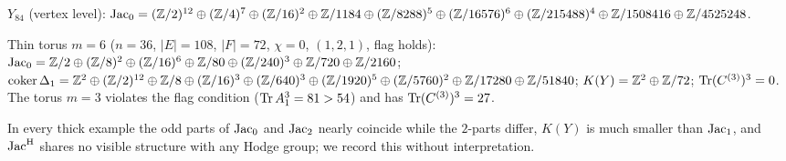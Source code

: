 $Y_{84}$ (vertex level): $\operatorname{Jac}_0=(\mathbb{Z}/2)^{12}\oplus(\mathbb{Z}/4)^{7}\oplus(\mathbb{Z}/16)^{2}\oplus\mathbb{Z}/1184\oplus
(\mathbb{Z}/8288)^{5}\oplus(\mathbb{Z}/16576)^{6}\oplus(\mathbb{Z}/215488)^{4}\oplus\mathbb{Z}/1508416\oplus\mathbb{Z}/4525248$.

Thin torus $m=6$ ($n=36$, $|E|=108$, $|F|=72$, $\chi=0$, $(1,2,1)$, flag holds):
$\operatorname{Jac}_0=\mathbb{Z}/2\oplus(\mathbb{Z}/8)^{2}\oplus(\mathbb{Z}/16)^{6}\oplus\mathbb{Z}/80\oplus(\mathbb{Z}/240)^{3}\oplus\mathbb{Z}/720\oplus\mathbb{Z}/2160$;
$\operatorname{coker}\Delta_1=\mathbb{Z}^{2}\oplus(\mathbb{Z}/2)^{12}\oplus\mathbb{Z}/8\oplus(\mathbb{Z}/16)^{3}\oplus(\mathbb{Z}/640)^{3}\oplus(\mathbb{Z}/1920)^{5}
\oplus(\mathbb{Z}/5760)^{2}\oplus\mathbb{Z}/17280\oplus\mathbb{Z}/51840$; $K(Y)=\mathbb{Z}^{2}\oplus\mathbb{Z}/72$;
$\operatorname{Tr}(C^{(3)})^{3}=0$. The torus $m=3$ violates the flag condition ($\operatorname{Tr} A_1^{3}=81>54$) and
has $\operatorname{Tr}(C^{(3)})^{3}=27$.

In every thick example the odd parts of $\operatorname{Jac}_0$ and $\operatorname{Jac}_2$ nearly coincide while the
$2$-parts differ, $K(Y)$ is much smaller than $\operatorname{Jac}_1$, and $\operatorname{Jac}^{\mathrm{H}}$ shares no visible
structure with any Hodge group; we record this without interpretation.

\begin{table}[ht]
\centering\scriptsize
\renewcommand{\arraystretch}{1.2}
\medskip
\caption{Exact verification (\texttt{pgl3\_building.py}). Sizes: shadow of $\DeltaH$ has
$3n+|E|$ vertices ($1512$ for $Y_{168}$); shadow of $\Delta_1$ has $2058$ vertices for
$Y_{21}$ and $2352$ for $Y_{24}$. Net traces of $\Lambda_Q$ for $Y_{168}$:
$168,\,3920,\,257544,\,16751728,\,\dots$; $m_0=3$.}
\label{X:tab:battery}
\end{table}

